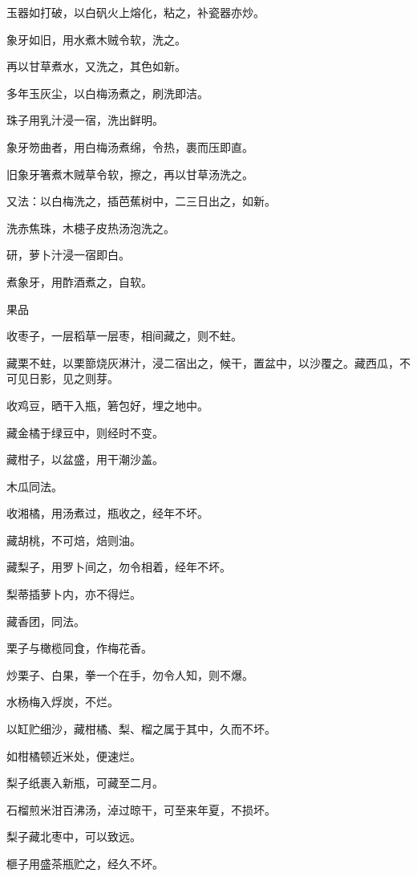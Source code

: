 \documentclass[a4paper,12pt,UTF8,twoside]{ctexbook}
\begin{document}
    玉器如打破，以白矾火上熔化，粘之，补瓷器亦炒。
    
    象牙如旧，用水煮木贼令软，洗之。
    
    再以甘草煮水，又洗之，其色如新。
    
    多年玉灰尘，以白梅汤煮之，刷洗即洁。
    
    珠子用乳汁浸一宿，洗出鲜明。
    
    象牙笏曲者，用白梅汤煮绵，令热，裹而压即直。
    
    旧象牙箸煮木贼草令软，擦之，再以甘草汤洗之。
    
    又法：以白梅洗之，插芭蕉树中，二三日出之，如新。
    
    洗赤焦珠，木槵子皮热汤泡洗之。
    
    研，萝卜汁浸一宿即白。
    
    煮象牙，用酢酒煮之，自软。
    
    果品
    
    收枣子，一层稻草一层枣，相间藏之，则不蛀。
    
    藏栗不蛀，以栗篰烧灰淋汁，浸二宿出之，候干，置盆中，以沙覆之。藏西瓜，不可见日影，见之则芽。
    
    收鸡豆，晒干入瓶，箬包好，埋之地中。
    
    藏金橘于绿豆中，则经时不变。
    
    藏柑子，以盆盛，用干潮沙盖。
    
    木瓜同法。
    
    收湘橘，用汤煮过，瓶收之，经年不坏。
    
    藏胡桃，不可焙，焙则油。
    
    藏梨子，用罗卜间之，勿令相着，经年不坏。
    
    梨蒂插萝卜内，亦不得烂。
    
    藏香团，同法。
    
    栗子与橄榄同食，作梅花香。
    
    炒栗子、白果，拳一个在手，勿令人知，则不爆。
    
    水杨梅入烰炭，不烂。
    
    以缸贮细沙，藏柑橘、梨、榴之属于其中，久而不坏。
    
    如柑橘顿近米处，便速烂。
    
    梨子纸裹入新瓶，可藏至二月。
    
    石榴煎米泔百沸汤，淖过晾干，可至来年夏，不损坏。
    
    梨子藏北枣中，可以致远。
    
    榧子用盛茶瓶贮之，经久不坏。
    
\end{document}
